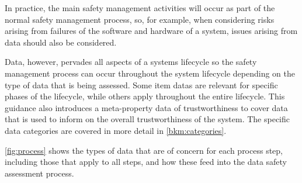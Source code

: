 In practice, the main safety management activities will
occur as part of the normal safety management process, so, for example, when considering risks arising
from failures of the software and hardware of a system, issues arising from data should also be
considered.

Data, however, pervades all aspects of a systems lifecycle so the safety management
process can occur throughout the system lifecycle depending on the type of data that is being
assessed. Some \glspl{item data} are relevant for
specific phases of the lifecycle, while others apply throughout the entire lifecycle. This guidance also introduces a meta-property data of trustworthiness
to cover data that is used to inform on the overall trustworthiness of the system. The specific data
categories are covered in more detail in \autoref{bkm:categories}.

\autoref{fig:process} shows the types of data that are of concern for each process step, including those that apply to all steps, and how these feed into the \gls{data safety assessment} process.
